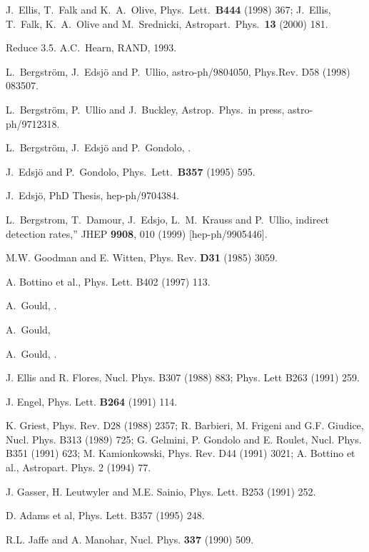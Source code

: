 \begin{thebibliography}{99}
J.~Ellis, T.~Falk and K.~A.~Olive,
Phys.\ Lett.\  {\bf B444} (1998) 367;
J.~Ellis, T.~Falk, K.~A.~Olive and M.~Srednicki,
Astropart.\ Phys.\  {\bf 13} (2000) 181.

{\sc Reduce} 3.5. A.C.~Hearn, RAND, 1993.

 L.~Bergstr\"om, J.~Edsj\"o and P.~Ullio,
astro-ph/9804050, Phys.Rev. D58 (1998) 083507.

  L.~Bergstr{\"om}, P.~Ullio and J.~Buckley,
Astrop.\ Phys.\ in press, astro-ph/9712318.

 L.~Bergstr{\"o}m, J.~Edsj{\"o} and P.~Gondolo,
.

 J.~Edsj{\"o} and P.~Gondolo, Phys.\ Lett.\ {\bf B357}
   (1995) 595.

J.~Edsj{\"o}, PhD Thesis, hep-ph/9704384.

L.~Bergstrom, T.~Damour, J.~Edsjo, L.~M.~Krauss and P.~Ullio,
indirect detection rates,''
JHEP {\bf 9908}, 010 (1999)
[hep-ph/9905446].

 M.W. Goodman and E. Witten, Phys. Rev. {\bf D31}
(1985) 3059.


 A. Bottino et al., Phys. Lett. B402 (1997) 113.

 A.~Gould, .

A.~Gould, 

A.~Gould, .

 J. Ellis and R. Flores, Nucl. Phys. B307 (1988)
883; Phys. Lett B263 (1991) 259.

 J. Engel, Phys. Lett. {\bf B264} (1991) 114.

K. Griest, Phys. Rev. D28 (1988) 2357; R. Barbieri, M. Frigeni and
G.F. Giudice, Nucl. Phys. B313 (1989) 725; G. Gelmini, P. Gondolo and
E. Roulet, Nucl. Phys. B351 (1991) 623; M. Kamionkowski, Phys. Rev.
D44 (1991) 3021; A. Bottino et al., Astropart. Phys. 2 (1994) 77.

 J. Gasser, H. Leutwyler and M.E. Sainio,
Phys. Lett. B253 (1991) 252.

 D. Adams et al,     Phys. Lett. B357 (1995) 248.

 R.L. Jaffe and A. Manohar, Nucl. Phys.
{\bf 337} (1990) 509.


\end{thebibliography}
